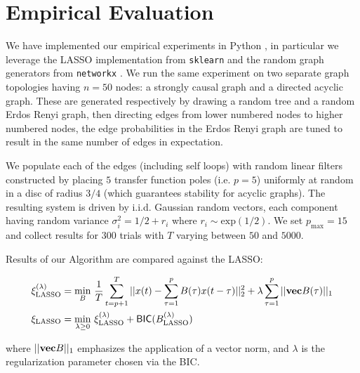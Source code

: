 \documentclass[12pt]{article}
\begin{document}
\section{Empirical Evaluation}
\label{sec:empirical_evaluation}
We have implemented our empirical experiments in Python \cite{scipy},
in particular we leverage the LASSO implementation from
\texttt{sklearn} \cite{sklearn} and the random graph generators from
\texttt{networkx} \cite{networkx}.  We run the same experiment on two
separate graph topologies having $n = 50$ nodes: a strongly causal
graph and a directed acyclic graph.  These are generated respectively
by drawing a random tree and a random Erdos Renyi graph, then
directing edges from lower numbered nodes to higher numbered nodes,
the edge probabilities in the Erdos Renyi graph are tuned to result in
the same number of edges in expectation.

We populate each of the edges (including self loops) with random
linear filters constructed by placing $5$ transfer function poles
(i.e. $p = 5$) uniformly at random in a disc of radius $3 / 4$ (which
guarantees stability for acyclic graphs).  The resulting system is
driven by i.i.d. Gaussian random vectors, each component having random
variance $\sigma_i^2 = 1/2 + r_i$ where $r_i \sim \text{exp}(1/2)$.
We set $p_{\text{max}} = 15$ and collect results for $300$ trials with $T$
varying between $50$ and $5000$.

Results of our Algorithm are compared against the LASSO:

\begin{equation}
  \begin{aligned}
  \xi_{\text{LASSO}}^{(\lambda)} &= \underset{B}{\text{min}}\ \frac{1}{T}\sum_{t = p + 1}^T||x(t) - \sum_{\tau = 1}^p B(\tau) x(t - \tau)||_2^2 + \lambda \sum_{\tau = 1}^p ||\matvec B(\tau)||_1\\
  \xi_{\text{LASSO}} &= \underset{\lambda \ge 0}{\text{min}}\ \xi_{\text{LASSO}}^{(\lambda)} + \mathsf{BIC}(B_{\text{LASSO}}^{(\lambda)})\\
  \end{aligned}
\end{equation}

where $||\textbf{vec} B||_1$ emphasizes the application of a vector norm, and
$\lambda$ is the regularization parameter chosen via the BIC.

\end{document}

